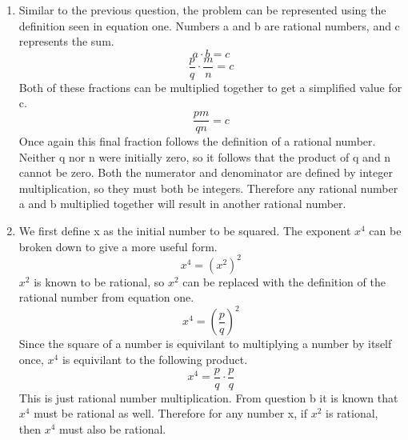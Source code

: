 \documentclass{article}
\begin{document}
\begin{enumerate}
\begin{enumerate}
                \item Similar to the previous question, the problem can be represented using the definition seen in equation one. Numbers a and b are rational numbers, and c represents the sum.
                      \begin{equation} a \cdot b = c \end{equation}
                      \begin{equation} \frac{p}{q} \cdot \frac{m}{n} = c \end{equation}
                      Both of these fractions can be multiplied together to get a simplified value for c.
                      \begin{equation} \frac{pm}{qn} = c \end{equation}
                      Once again this final fraction follows the definition of a rational number. Neither q nor n were initially zero, so it follows that the product of q and n cannot be zero. Both the numerator and denominator are defined by integer multiplication, so they must both be integers. Therefore any rational number a and b multiplied together will result in another rational number.

                \item We first define x as the initial number to be squared. The exponent $x^{4}$ can be broken down to give a more useful form.
                      \begin{equation} x^{4} = (x^{2})^{2} \end{equation}
                      $x^{2}$ is known to be rational, so $x^{2}$ can be replaced with the definition of the rational number from equation one.
                      \begin{equation} x^{4} = (\frac{p}{q})^{2} \end{equation}
                      Since the square of a number is equivilant to multiplying a number by itself once, $x^{4}$ is equivilant to the following product.
                      \begin{equation} x^{4} = \frac{p}{q} \cdot \frac{p}{q} \end{equation}
                      This is just rational number multiplication. From question b it is known that $x^{4}$ must be rational as well. Therefore for any number x, if $x^{2}$ is rational, then $x^{4}$ must also be rational.
        \end{enumerate}
    \end{enumerate}
    
\end{document}
